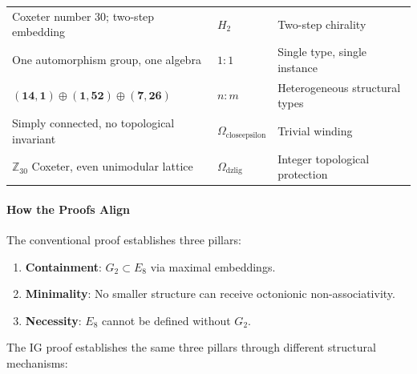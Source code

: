 \documentclass[12pt,a4paper]{article}
\begin{document}
\begin{table}[htbp]
\begin{tabularx}{\textwidth}{>{\centering\arraybackslash}X >{\centering\arraybackslash}X >{\centering\arraybackslash}X}
Coxeter number 30; two-step embedding & $H_2$ & Two-step chirality \\
One automorphism group, one algebra & $1{:}1$ & Single type, single instance \\
$(\mathbf{14},\mathbf{1}) \oplus (\mathbf{1},\mathbf{52}) \oplus (\mathbf{7},\mathbf{26})$ & $n{:}m$ & Heterogeneous structural types \\
Simply connected, no topological invariant & $\Omega_{\text{closeepsilon}}$ & Trivial winding \\
$\mathbb{Z}_{30}$ Coxeter, even unimodular lattice & $\Omega_{\text{dzlig}}$ & Integer topological protection \\
\bottomrule
\end{tabularx}
\end{table}

\paragraph{How the Proofs Align}

The conventional proof establishes three pillars:

\begin{enumerate}
    \item \textbf{Containment}: $G_2 \subset E_8$ via maximal embeddings.
    \item \textbf{Minimality}: No smaller structure can receive octonionic non-associativity.
    \item \textbf{Necessity}: $E_8$ cannot be defined without $G_2$.
\end{enumerate}

The IG proof establishes the same three pillars through different structural mechanisms:
\end{document}

